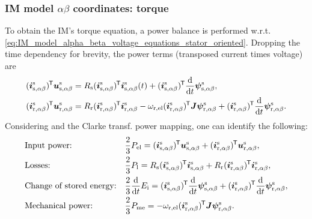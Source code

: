 \begin{frame}
	\frametitle{IM model $\alpha\beta$ coordinates: torque}
    To obtain the IM's torque equation, a power balance is performed w.r.t. \eqref{eq:IM_model_alpha_beta_voltage_equations_stator_oriented}. Dropping the time dependency for brevity, the power terms (transposed current times voltage) are 
    \begin{equation}
        \begin{split}
            (\bm{i}^\mathrm{s}_\mathrm{s,\alpha\beta})^{\mkern-1.5mu\mathsf{T}}\bm{u}^\mathrm{s}_\mathrm{s,\alpha\beta} &= R_\mathrm{s} (\bm{i}^\mathrm{s}_\mathrm{s,\alpha\beta})^{\mkern-1.5mu\mathsf{T}}\bm{i}^\mathrm{s}_\mathrm{s,\alpha\beta}(t)+ (\bm{i}^\mathrm{s}_\mathrm{s,\alpha\beta})^{\mkern-1.5mu\mathsf{T}}\frac{\mathrm{d}}{\mathrm{d}t}\bm{\psi}^\mathrm{s}_\mathrm{s,\alpha\beta},\\
            (\bm{i}^\mathrm{s}_\mathrm{r,\alpha\beta})^{\mkern-1.5mu\mathsf{T}}\bm{u}^\mathrm{s}_\mathrm{r,\alpha\beta} &= R_\mathrm{r} (\bm{i}^\mathrm{s}_\mathrm{r,\alpha\beta})^{\mkern-1.5mu\mathsf{T}}\bm{i}^\mathrm{s}_\mathrm{r,\alpha\beta}-\omega_\mathrm{r,el}(\bm{i}^\mathrm{s}_\mathrm{r,\alpha\beta})^{\mkern-1.5mu\mathsf{T}}\bm{J}\bm{\psi}^\mathrm{s}_\mathrm{r,\alpha\beta} + (\bm{i}^\mathrm{s}_\mathrm{r,\alpha\beta})^{\mkern-1.5mu\mathsf{T}}\frac{\mathrm{d}}{\mathrm{d}t}\bm{\psi}^\mathrm{s}_\mathrm{r,\alpha\beta}.
    \end{split}
\end{equation} 
Considering  and the Clarke transf. power mapping, one can identify the following:
\begin{equation}
    \begin{alignedat}{2}
        &\mbox{Input power:} &&\frac{2}{3}P_\mathrm{el} = (\bm{i}^\mathrm{s}_\mathrm{s,\alpha\beta})^{\mkern-1.5mu\mathsf{T}}\bm{u}^\mathrm{s}_\mathrm{s,\alpha\beta} + (\bm{i}^\mathrm{s}_\mathrm{r,\alpha\beta})^{\mkern-1.5mu\mathsf{T}}\bm{u}^\mathrm{s}_\mathrm{r,\alpha\beta},\\
        &\mbox{Losses:} &&\frac{2}{3}P_\mathrm{l} = R_\mathrm{s} (\bm{i}^\mathrm{s}_\mathrm{s,\alpha\beta})^{\mkern-1.5mu\mathsf{T}}\bm{i}^\mathrm{s}_\mathrm{s,\alpha\beta} + R_\mathrm{r} (\bm{i}^\mathrm{s}_\mathrm{r,\alpha\beta})^{\mkern-1.5mu\mathsf{T}}\bm{i}^\mathrm{s}_\mathrm{r,\alpha\beta},\\
        &\mbox{Change of stored energy:} \quad &&\frac{2}{3}\frac{\mathrm{d}}{\mathrm{d}t}E_\mathrm{i} = (\bm{i}^\mathrm{s}_\mathrm{s,\alpha\beta})^{\mkern-1.5mu\mathsf{T}}\frac{\mathrm{d}}{\mathrm{d}t}\bm{\psi}^\mathrm{s}_\mathrm{s,\alpha\beta} + (\bm{i}^\mathrm{s}_\mathrm{r,\alpha\beta})^{\mkern-1.5mu\mathsf{T}}\frac{\mathrm{d}}{\mathrm{d}t}\bm{\psi}^\mathrm{s}_\mathrm{r,\alpha\beta},\\
        &\mbox{Mechanical power:} &&\frac{2}{3}P_\mathrm{me} = -\omega_\mathrm{r,el}(\bm{i}^\mathrm{s}_\mathrm{r,\alpha\beta})^{\mkern-1.5mu\mathsf{T}}\bm{J}\bm{\psi}^\mathrm{s}_\mathrm{r,\alpha\beta}.
    \end{alignedat}
     \label{eq:power_balance_machine_alpha_beta}
\end{equation}
\end{frame}

